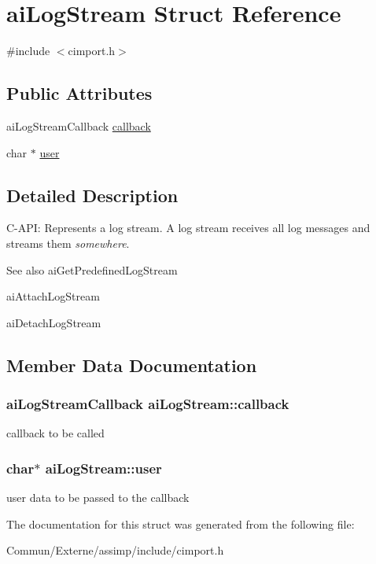 \hypertarget{structai_log_stream}{}\section{ai\+Log\+Stream Struct Reference}
\label{structai_log_stream}


{\ttfamily \#include $<$cimport.\+h$>$}

\subsection*{Public Attributes}
\begin{DoxyCompactItemize}
\item 
ai\+Log\+Stream\+Callback \hyperlink{structai_log_stream_ac73ae46eee54ba0f920d6abb97c33e97}{callback}
\item 
char $\ast$ \hyperlink{structai_log_stream_a3382042e4171a6dd5a71d7f98741f86e}{user}
\end{DoxyCompactItemize}


\subsection{Detailed Description}
C-\/\+A\+PI\+: Represents a log stream. A log stream receives all log messages and streams them {\itshape somewhere}. \begin{DoxySeeAlso}{See also}
ai\+Get\+Predefined\+Log\+Stream 

ai\+Attach\+Log\+Stream 

ai\+Detach\+Log\+Stream 
\end{DoxySeeAlso}


\subsection{Member Data Documentation}
\subsubsection[{\texorpdfstring{callback}{callback}}]{\setlength{\rightskip}{0pt plus 5cm}ai\+Log\+Stream\+Callback ai\+Log\+Stream\+::callback}\hypertarget{structai_log_stream_ac73ae46eee54ba0f920d6abb97c33e97}{}\label{structai_log_stream_ac73ae46eee54ba0f920d6abb97c33e97}
callback to be called 
\subsubsection[{\texorpdfstring{user}{user}}]{\setlength{\rightskip}{0pt plus 5cm}char$\ast$ ai\+Log\+Stream\+::user}\hypertarget{structai_log_stream_a3382042e4171a6dd5a71d7f98741f86e}{}\label{structai_log_stream_a3382042e4171a6dd5a71d7f98741f86e}
user data to be passed to the callback 

The documentation for this struct was generated from the following file\+:\begin{DoxyCompactItemize}
\item 
Commun/\+Externe/assimp/include/cimport.\+h\end{DoxyCompactItemize}
